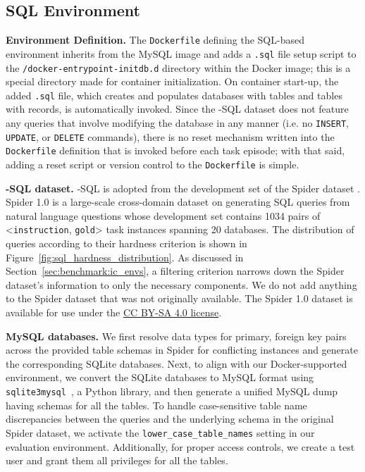 

\subsection{SQL Environment}
\label{appx:env:sqlenv}
\textbf{Environment Definition.} The \texttt{Dockerfile} defining the SQL-based environment inherits from the MySQL image and adds a \texttt{.sql} file setup script to the \texttt{/docker-entrypoint-initdb.d} directory within the Docker image; this is a special directory made for container initialization. On container start-up, the added \texttt{.sql} file, which creates and populates databases with tables and tables with records, is automatically invoked. Since the \benchmark{}-SQL dataset does not feature any queries that involve modifying the database in any manner (i.e. no \texttt{INSERT}, \texttt{UPDATE}, or \texttt{DELETE} commands), there is no reset mechanism written into the \texttt{Dockerfile} definition that is invoked before each task episode; with that said, adding a reset script or version control to the \texttt{Dockerfile} is simple.

\textbf{\benchmark-SQL dataset.}
\benchmark-SQL is adopted from the development set of the Spider dataset \cite{yu-etal-2018-spider}. Spider 1.0 is a large-scale cross-domain dataset on generating SQL queries from natural language questions whose development set contains 1034 pairs of <\texttt{instruction}, \texttt{gold}> task instances spanning 20 databases.
The distribution of queries according to their hardness criterion is shown in Figure~\ref{fig:sql_hardness_distribution}.
As discussed in Section~\ref{sec:benchmark:ic_envs}, a filtering criterion narrows down the Spider dataset's information to only the necessary components.
We do not add anything to the Spider dataset that was not originally available.
The Spider 1.0 dataset is available for use under the \hyperlink{https://creativecommons.org/licenses/by-sa/4.0/legalcode}{CC BY-SA 4.0 license}.



\textbf{MySQL databases.} We first resolve data types for primary, foreign key pairs across the provided table schemas in Spider for conflicting instances and generate the corresponding SQLite databases. Next, to align with our Docker-supported environment, we convert the SQLite databases to MySQL format using \texttt{sqlite3mysql}~\cite{sqlite3mysql}, a Python library, and then generate a unified MySQL dump having schemas for all the tables. To handle case-sensitive table name discrepancies between the queries and the underlying schema in the original Spider dataset, we activate the \texttt{lower\_case\_table\_names} setting in our evaluation environment. Additionally, for proper access controls, we create a test user and grant them all privileges for all the tables.

